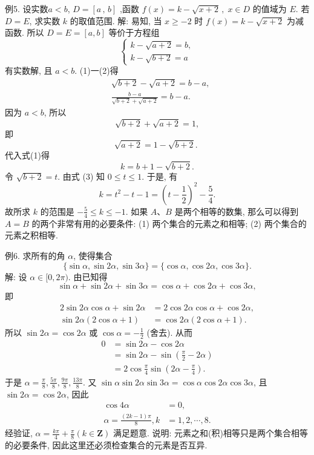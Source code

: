 例5. 设实数$a<b$, $D=[a\,,\,b]$ ,函数 $f(x)=k-\sqrt{x+2}\,,\;x\in D$ 的值域为 $E$. 若 $D=E$, 求实数 $k$ 的取值范围.
解: 易知, 当 $x \geqslant-2$ 时 $f(x)=k-\sqrt{x+2}$ 为减函数.
所以 $D=E=[a, b]$ 等价于方程组
$$
\left\{\begin{array}{l}
k-\sqrt{a+2}=b, \\
k-\sqrt{b+2}=a
\end{array}\right.
$$
有实数解, 且 $a<b$.
(1)一(2)得
$$
\begin{aligned}
& \sqrt{b+2}-\sqrt{a+2}=b-a, \\
& \frac{b-a}{\sqrt{b+2}+\sqrt{a+2}}=b-a .
\end{aligned}
$$
因为 $a<b$, 所以
$$
\sqrt{b+2}+\sqrt{a+2}=1,
$$
即
$$
\sqrt{a+2}=1-\sqrt{b+2} \text {. }
$$
代入式(1)得
$$
k=b+1-\sqrt{b+2} .
$$
令 $\sqrt{b+2}=t$. 由式 (3) 知 $0 \leqslant t \leqslant 1$. 于是, 有
$$
k=t^2-t-1=\left(t-\frac{1}{2}\right)^2-\frac{5}{4} .
$$
故所求 $k$ 的范围是 $-\frac{5}{4} \leqslant k \leqslant-1$.
如果 $A 、 B$ 是两个相等的数集, 那么可以得到 $A=B$ 的两个非常有用的必要条件:
(1) 两个集合的元素之和相等;
(2) 两个集合的元素之积相等.



例6. 求所有的角 $\alpha$, 使得集合
$$
\{\sin \alpha, \sin 2 \alpha, \sin 3 \alpha\}=\{\cos \alpha, \cos 2 \alpha, \cos 3 \alpha\} .
$$
解: 设 $\alpha \in[0,2 \pi)$. 由已知得
$$
\sin \alpha+\sin 2 \alpha+\sin 3 \alpha=\cos \alpha+\cos 2 \alpha+\cos 3 \alpha,
$$
即
$$
\begin{aligned}
2 \sin 2 \alpha \cos \alpha+\sin 2 \alpha & =2 \cos 2 \alpha \cos \alpha+\cos 2 \alpha, \\
\sin 2 \alpha(2 \cos \alpha+1) & =\cos 2 \alpha(2 \cos \alpha+1) .
\end{aligned}
$$
所以 $\sin 2 \alpha=\cos 2 \alpha$ 或 $\cos \alpha=-\frac{1}{2}$ (舍去).
从而
$$
\begin{aligned}
0 & =\sin 2 \alpha-\cos 2 \alpha \\
& =\sin 2 \alpha-\sin \left(\frac{\pi}{2}-2 \alpha\right) \\
& =2 \cos \frac{\pi}{4} \sin \left(2 \alpha-\frac{\pi}{4}\right) .
\end{aligned}
$$
于是 $\alpha=\frac{\pi}{8}, \frac{5 \pi}{8}, \frac{9 \pi}{8}, \frac{13 \pi}{8}$.
又 $\sin \alpha \sin 2 \alpha \sin 3 \alpha=\cos \alpha \cos 2 \alpha \cos 3 \alpha$, 且 $\sin 2 \alpha=\cos 2 \alpha$, 因此
$$
\begin{aligned}
\cos 4 \alpha & =0, \\
\alpha=\frac{(2 k-1) \pi}{8}, k & =1,2, \cdots, 8 .
\end{aligned}
$$
经验证, $\alpha=\frac{k \pi}{4}+\frac{\pi}{8}(k \in \mathbf{Z})$ 满足题意.
说明: 元素之和(积)相等只是两个集合相等的必要条件, 因此这里还必须检查集合的元素是否互异.



